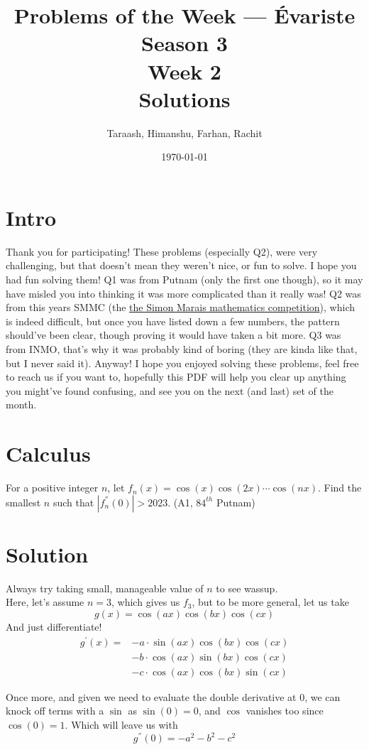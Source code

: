 \documentclass[12pt, letterpaper]{article}
\title{\vspace{-2cm}Problems of the Week --- Évariste \\ Season 3 \\ Week 2 \\ Solutions}
\author{Taraash, Himanshu, Farhan, Rachit}
\date{\today}
\begin{document}
\maketitle

\section*{Intro}
Thank you for participating! These problems (especially Q2), were very challenging, but that doesn't mean they weren't nice, or fun to solve. I hope you had fun solving them! Q1 was from Putnam (only the first one though), so it may have misled you into thinking it was more complicated than it really was! Q2 was from this years SMMC (the \href{https://www.simonmarais.org/}{\color{orange} the Simon Marais mathematics competition}), which is indeed difficult, but once you have listed down a few numbers, the pattern should've been clear, though proving it would have taken a bit more. Q3 was from INMO, that's why it was probably kind of boring (they are kinda like that, but I never said it). Anyway! I hope you enjoyed solving these problems, feel free to reach us if you want to, hopefully this PDF will help you clear up anything you might've found confusing, and see you on the next (and last) set of the month.
\newpage

\section{Calculus}
For a positive integer $n$, let \(f_n(x) = \cos{(x)}\cos{(2x)}\cdots\cos{(nx)}\). Find the smallest $n$ such that \(|f_n^{''}(0)| > 2023\). {\color{gray}(A1, $84^{th}$ Putnam)}

\section*{Solution}
\colorbox{Dandelion}{Always try taking small, manageable value of $n$ to see wassup.}\\
Here, let's assume $n=3$, which gives us $f_3$, but to be more general, let us take \[
g(x)=\cos{(ax)}\cos{(bx)}\cos{(cx)}
\]
And just differentiate! 
\begin{align*}
    g^{'}(x) = &-a\cdot\sin(ax)\cos(bx)\cos(cx) \\
    &-b\cdot\cos(ax)\sin(bx)\cos(cx) \\
    &-c\cdot\cos(ax)\cos(bx)\sin(cx)
\end{align*}

Once more, and given we need to evaluate the double derivative at 0, we can knock off terms with a $\sin$ as $\sin(0)=0$, and $\cos$ vanishes too since $\cos(0)=1$. Which will leave us with \[
g^{''}(0) = -a^2 - b^2 - c^2
\]
\end{document}

